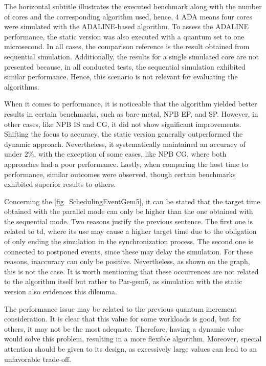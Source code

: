 The horizontal subtitle illustrates the executed benchmark along with the number of cores and the corresponding algorithm used, hence, 4 ADA 
means four cores were simulated with the ADALINE-based algorithm. To assess the ADALINE performance, the static version was also executed with 
a quantum set to one microsecond. In all cases, the comparison reference is the result obtained from sequential simulation. Additionally, the 
results for a single simulated core are not presented because, in all conducted tests, the sequential simulation exhibited similar performance. 
Hence, this scenario is not relevant for evaluating the algorithms.

When it comes to performance, it is noticeable that the algorithm yielded better results in certain benchmarks, such as bare-metal, NPB EP, and SP. 
However, in other cases, like NPB IS and CG, it did not show significant improvements. Shifting the focus to accuracy, the static version generally 
outperformed the dynamic approach. Nevertheless, it systematically maintained an accuracy of under 2\%, with the exception of some cases, like
NPB CG, where both approaches had a poor performance. Lastly, when comparing the host time to performance, similar outcomes were observed, though 
certain benchmarks exhibited superior results to others.

Concerning the \autoref{fig_SchedulingEventGem5}, it can be stated that the target time obtained with the parallel mode can only 
be higher than the one obtained with the sequential mode. Two reasons justify the previous sentence. The first one is related to 
\gls{td}, where its use may cause a higher target time due to the obligation of only ending the simulation in the synchronization process. 
The second one is connected to postponed events, since these may delay the simulation. For these reasons, inaccuracy can only be positive.
Nevertheless, as shown on the graph, this is not the case. It is worth mentioning that these occurrences are not related to 
the algorithm itself but rather to Par-gem5, as simulation with the static version also evidences this dilemma.

The performance issue may be related to the previous quantum increment consideration. It is clear that this value for some workloads is good, but 
for others, it may not be the most adequate. Therefore, having a dynamic value would solve this problem, resulting in a more flexible algorithm. 
Moreover, special attention should be given to its design, as excessively large values can lead to an unfavorable trade-off.


